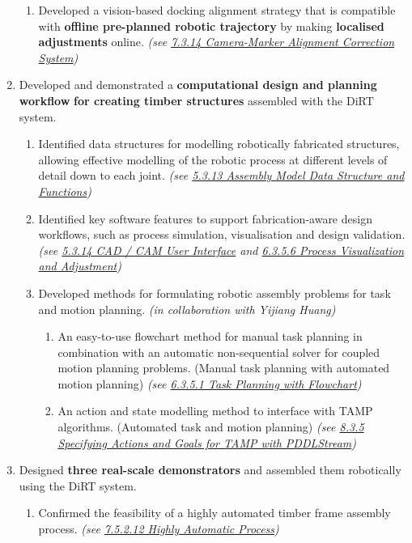 \begin{enumerate}
\begin{enumerate}
	\item Developed a vision-based docking alignment strategy that is compatible with \textbf{offline pre-planned robotic trajectory} by making \textbf{localised adjustments} online. \textit{(see \uline{7.3.14 Camera-Marker Alignment Correction System})}

\end{enumerate}
	\item Developed and demonstrated a \textbf{computational design and planning workflow} \textbf{for creating timber structures} assembled with the DiRT system.

\begin{enumerate}
	\item Identified data structures for modelling robotically fabricated structures, allowing effective modelling of the robotic process at different levels of detail down to each joint. \textit{(see \uline{5.3.13 Assembly Model Data Structure and Functions})}

	\item Identified key software features to support fabrication-aware design workflows, such as process simulation, visualisation and design validation. \textit{(see \uline{5.3.14 CAD / CAM User Interface} and \uline{6.3.5.6 Process Visualization and Adjustment})}

	\item Developed methods for formulating robotic assembly problems for task and motion planning. \textit{(in collaboration with Yijiang Huang)} 

\begin{enumerate}
	\item An easy-to-use flowchart method for manual task planning in combination with an automatic non-sequential solver for coupled motion planning problems. (Manual task planning with automated motion planning) \textit{(see \uline{6.3.5.1 Task Planning with Flowchart})}

	\item An action and state modelling method to interface with TAMP algorithms. (Automated task and motion planning) \textit{(see \uline{8.3.5 Specifying Actions and Goals for TAMP with PDDLStream})}

\end{enumerate}
\end{enumerate}
	\item Designed \textbf{three real-scale demonstrators} and assembled them robotically using the DiRT system.

\begin{enumerate}
	\item Confirmed the feasibility of a highly automated timber frame assembly process. \textit{(see \uline{7.5.2.12 Highly Automatic Process})}


\end{enumerate}
\end{enumerate}
